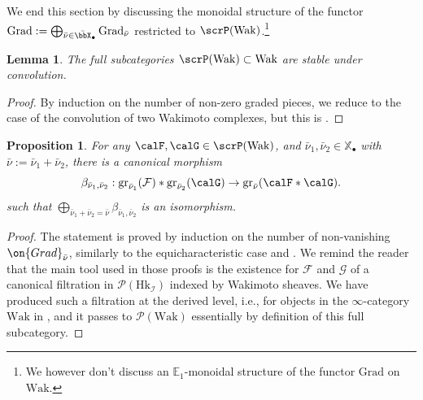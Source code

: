 \documentclass[10pt, reqno]{amsart}
\theoremstyle{plain}
\newtheorem{proposition}[theorem]{Proposition}
\newtheorem{lemma}[theorem]{Lemma}
\theoremstyle{definition}
\numberwithin{equation}{section}
\begin{document}
	We end this section by discussing the monoidal structure of the functor $\mathrm{Grad}:=\bigoplus_{\bar \nu\in \bar\bbX_{\bullet}}\mathrm{Grad}_{\bar \nu}$ restricted to $\scrP(\mathrm{Wak})$.\footnote{We however don't discuss an $\mathbb{E}_1$-monoidal structure of the functor $\mathrm{Grad}$ on $\mathrm{Wak}$.} 
	
	\begin{lemma}
		The full subcategories $\scrP(\mathrm{Wak}) \subset \mathrm{Wak}$ are stable under convolution.
	\end{lemma}
	
	\begin{proof}
		By induction on the number of non-zero graded pieces, we reduce to the case of the convolution of two Wakimoto complexes, but this is .    
	\end{proof}
	
	\begin{proposition} \label{gr-convol}
		For any $\calF,
		\calG \in \scrP({\rm Wak})$, 
		and $\bar\nu_1,\bar\nu_2\in \mathbb{X}_\bullet$ with $\bar\nu:=\bar\nu_1+\bar\nu_2$, there is a canonical morphism 
		\begin{equation}
			\beta_{\bar\nu_1,\bar\nu_2}:\mathrm{gr}_{\bar\nu_1}(\mathcal{F})\ast\mathrm{gr}_{\bar\nu_2}(\calG)\rightarrow \mathrm{gr}_{\bar\nu}(\calF*\calG).
		\end{equation}
		such that $\bigoplus_{\bar\nu_1+\bar\nu_2=\bar\nu}\beta_{\bar\nu_1,\bar\nu_2}$ is an isomorphism. 
	\end{proposition}
	
	\begin{proof}
		The statement is proved by induction on the number of non-vanishing $\on{Grad}_{\bar \nu}$, similarly to the equicharacteristic case \cite[Proposition 6a)]{AB09} and \cite[Lemma 4.7.4, Proposition 4.7.5]{AR}. We remind the reader that the main tool used in those proofs is the existence for $\mathcal{F}$ and $\mathcal{G}$ of a canonical filtration in $\mathcal{P}(\mathrm{Hk}_{\mathcal{I}})$ indexed by Wakimoto sheaves. We have produced such a filtration at the derived level, i.e., for objects in the $\infty$-category $\mathrm{Wak}$ in , and it passes to $\mathscr{P}(\mathrm{Wak})$ essentially by definition of this full subcategory.
	\end{proof}
	
\end{document}
